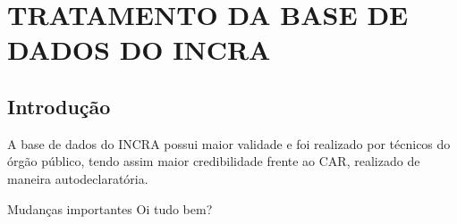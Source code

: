
\chapter{TRATAMENTO DA BASE DE DADOS DO INCRA}
\begin{multicols}{2}

\section{Introdução}
A base de dados do INCRA possui maior validade e foi realizado por técnicos do órgão público, tendo assim maior credibilidade frente ao CAR, realizado de maneira autodeclaratória.


\end{multicols}

\begin{bclogo}[
    couleur=bgblue,
    arrondi=0,
    logo=,
    barre=none,
    noborder=true]{Mudanças importantes}
  Oi tudo bem?
  \end{bclogo}
